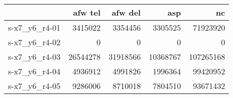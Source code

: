 \begin{tabular}{lrrrr}
\toprule
{} &  afw tel&  afw del &  asp &   nc \\
\midrule
s-x7\_y6\_r4-01 &   3415022 &       3354456 &   3305525 &  71923920 \\
s-x7\_y6\_r4-02 &         0 &             0 &         0 &         0 \\
s-x7\_y6\_r4-03 &  26544278 &      31918566 &  10368767 & 107265168 \\
s-x7\_y6\_r4-04 &   4936912 &       4991826 &   1996364 &  99420952 \\
s-x7\_y6\_r4-05 &   9286006 &       8710018 &   7804510 &  93671432 \\
\bottomrule
\end{tabular}
